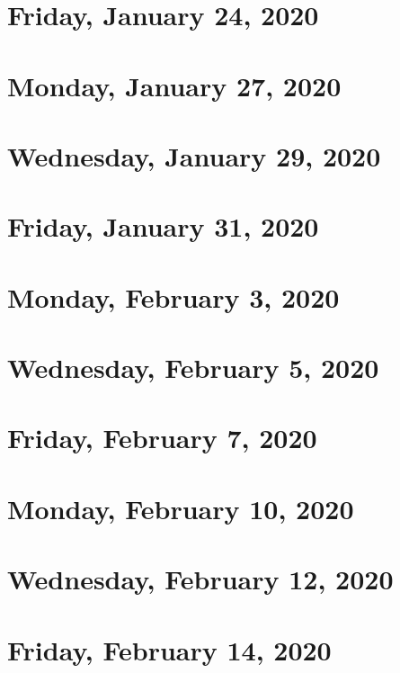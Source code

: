 \documentclass{../mynotes}
\begin{document}
\section{Friday, January 24, 2020}
    

\section{Monday, January 27, 2020}
	
\section{Wednesday, January 29, 2020}
    
\section{Friday, January 31, 2020}
    

\section{Monday, February 3, 2020}
	
\section{Wednesday, February 5, 2020}
    
\section{Friday, February 7, 2020}
    

\section{Monday, February 10, 2020}
	
\section{Wednesday, February 12, 2020}
    
\section{Friday, February 14, 2020}
    
    
%     
%     
\end{document}
